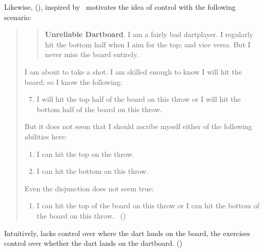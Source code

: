 \begin{note}
  Likewise, \citeauthor{Boylan:2020aa} (\citeyear{Boylan:2020aa}), inspired by~\textcite{Kenny:1976vh} motivates the idea of control with the following scenario:
  \begin{quote}
    \begin{quote}
      \textbf{Unreliable Dartboard}.
      I am a fairly bad dartplayer.
      I regularly hit the bottom half when I aim for the top; and vice versa.
      But I never miss the board entirely.
    \end{quote}

    I am about to take a shot.
    I am skilled enough to know I will hit the board; so I know the following:

    \begin{enumerate}[label=(\arabic*)]
      \setcounter{enumi}{6}
    \item
      I will hit the top half of the board on this throw or I will hit the bottom half of the board on this throw.
    \end{enumerate}

    But it does not seem that I should ascribe myself either of the following abilities here:

    \begin{enumerate}[label=(\arabic*), ref=(\arabic*), resume]
    \item
      I can hit the top on the throw.
    \item
      I can hit the bottom on this throw.
    \end{enumerate}

    Even the disjunction does not seem true:

    \begin{enumerate}[label=(\arabic*), ref=(\arabic*), resume]
    \item
      \label{Boylan:10}
      I can hit the top of the board on this throw or I can hit the bottom of the board on this throw.%
      \mbox{ }\hfill\mbox{(\citeyear[3]{Boylan:2020aa})}
    \end{enumerate}
  \end{quote}

  Intuitively, \citeauthor{Boylan:2020aa} lacks control over where the dart lands on the board, the exercises control over whether the dart lands on the dartboard.
  (\citeyear[\S2,19--20]{Boylan:2020aa})
\end{note}

